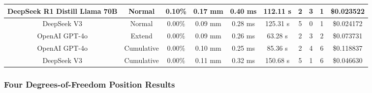 \begin{table}[H]
\begin{center}
\begin{tabular}{|c|c|c|c|c|c|c|c|c|c|}
    \hline
    DeepSeek R1 Distill Llama 70B & Normal & 0.10\% & 0.17 mm & 0.40 ms & 112.11 s & 2 & 3 & 1 & \$0.023522 \\
    \hline
    DeepSeek V3 & Normal & 0.00\% & 0.09 mm & 0.28 ms & 125.31 s & 5 & 0 & 1 & \$0.024172 \\
    \hline
    OpenAI GPT-4o & Extend & 0.00\% & 0.09 mm & 0.26 ms & 63.28 s & 2 & 3 & 2 & \$0.073731 \\
    \hline
    OpenAI GPT-4o & Cumulative & 0.00\% & 0.10 mm & 0.25 ms & 85.36 s & 2 & 4 & 6 & \$0.118837 \\
    \hline
    DeepSeek V3 & Cumulative & 0.00\% & 0.11 mm & 0.32 ms & 150.68 s & 5 & 1 & 6 & \$0.046630 \\
    \hline
\end{tabular}
\label{Results-Position-4-6}
\end{center}
\end{table}

\subsubsection{Four Degrees-of-Freedom Position Results}


